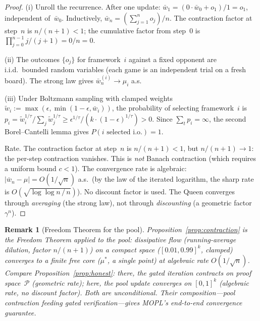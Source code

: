 \documentclass[11pt,a4paper]{article}
\newtheorem{remark}[theorem]{Remark}
\newcommand{\cP}{\mathcal{P}}
\begin{document}
\begin{proof}
\textup{(i)}\;
Unroll the recurrence.
After one update:
$\bar{w}_1 = (0 \cdot \bar{w}_0 + o_1)/1 = o_1$,
independent of~$\bar{w}_0$.
Inductively, $\bar{w}_n = (\sum_{j=1}^n o_j)/n$.
The contraction factor at step~$n$ is
$n/(n{+}1) < 1$; the cumulative factor from step~0
is $\prod_{j=0}^{n-1} j/(j{+}1) = 0/n = 0$.

\medskip\noindent
\textup{(ii)}\;
The outcomes $\{o_j\}$ for framework~$i$ against a
fixed opponent are i.i.d.\ bounded random variables
(each game is an independent trial on a fresh board).
The strong law gives
$\bar{w}_n^{(i)} \to \mu_i$ a.s.

\medskip\noindent
\textup{(iii)}\;
Under Boltzmann sampling with clamped weights
$\tilde{w}_i := \max(\epsilon,
  \min(1{-}\epsilon, \bar{w}_i))$,
the probability of selecting framework~$i$ is
$p_i = \tilde{w}_i^{1/\tau} / \sum_j \tilde{w}_j^{1/\tau}
\geq \epsilon^{1/\tau} /
  (k \cdot (1{-}\epsilon)^{1/\tau}) > 0$.
Since $\sum_t p_i = \infty$, the second Borel--Cantelli
lemma gives $P(i \text{ selected i.o.}) = 1$.

\medskip\noindent
\textup{Rate.}\;
The contraction factor at step~$n$ is $n/(n{+}1) < 1$,
but $n/(n{+}1) \to 1$: the per-step contraction vanishes.
This is \emph{not} Banach contraction
(which requires a uniform bound $c < 1$).
The convergence rate is algebraic:
$|\bar{w}_n - \mu| = O(1/\sqrt{n})$ a.s.\
(by the law of the iterated logarithm, the sharp
rate is $O(\sqrt{\log\log n \,/\, n})$).
No discount factor is used.
The Queen converges through \emph{averaging}
(the strong law), not through \emph{discounting}
(a geometric factor $\gamma^n$).
\end{proof}

\begin{remark}[Freedom Theorem for the pool]%
\label{rem:freedom-pool}
Proposition~\ref{prop:contraction} is the Freedom Theorem
applied to the pool:
dissipative flow (running-average dilution,
factor $n/(n{+}1)$) on a compact space
($[0.01, 0.99]^k$, clamped) converges to a
finite free core ($\mu^*$, a single point)
at algebraic rate $O(1/\sqrt{n})$.
Compare Proposition~\ref{prop:honest}:
there, the \emph{gated iteration} contracts on
proof space~$\cP$ (geometric rate);
here, the \emph{pool update} converges on $[0,1]^k$
(algebraic rate, no discount factor).
Both are unconditional.
Their composition---pool contraction feeding
gated verification---gives MOPL's end-to-end
convergence guarantee.
\end{remark}
\end{document}
